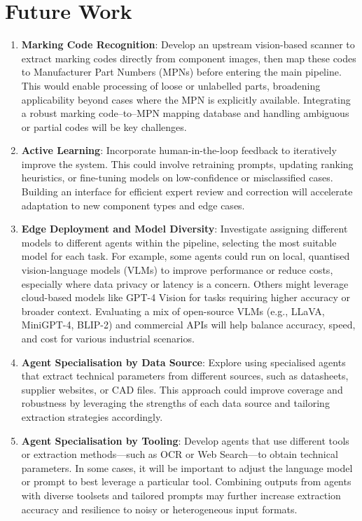 \section{Future Work}
\begin{enumerate}
  \item \textbf{Marking Code Recognition}: Develop an upstream vision-based scanner to extract marking codes directly from component images, then map these codes to Manufacturer Part Numbers (MPNs) before entering the main pipeline. This would enable processing of loose or unlabelled parts, broadening applicability beyond cases where the MPN is explicitly available. Integrating a robust marking code–to–MPN mapping database and handling ambiguous or partial codes will be key challenges.
  \item \textbf{Active Learning}: Incorporate human-in-the-loop feedback to iteratively improve the system. This could involve retraining prompts, updating ranking heuristics, or fine-tuning models on low-confidence or misclassified cases. Building an interface for efficient expert review and correction will accelerate adaptation to new component types and edge cases.
  \item \textbf{Edge Deployment and Model Diversity}: Investigate assigning different models to different agents within the pipeline, selecting the most suitable model for each task. For example, some agents could run on local, quantised vision-language models (VLMs) to improve performance or reduce costs, especially where data privacy or latency is a concern. Others might leverage cloud-based models like GPT-4 Vision for tasks requiring higher accuracy or broader context. Evaluating a mix of open-source VLMs (e.g., LLaVA, MiniGPT-4, BLIP-2) and commercial APIs will help balance accuracy, speed, and cost for various industrial scenarios.
  \item \textbf{Agent Specialisation by Data Source}: Explore using specialised agents that extract technical parameters from different sources, such as datasheets, supplier websites, or CAD files. This approach could improve coverage and robustness by leveraging the strengths of each data source and tailoring extraction strategies accordingly.
  \item \textbf{Agent Specialisation by Tooling}: Develop agents that use different tools or extraction methods—such as OCR or Web Search—to obtain technical parameters. In some cases, it will be important to adjust the language model or prompt to best leverage a particular tool. Combining outputs from agents with diverse toolsets and tailored prompts may further increase extraction accuracy and resilience to noisy or heterogeneous input formats.
\end{enumerate}

